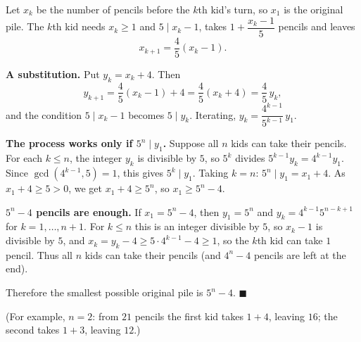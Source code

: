 Let $x_k$ be the number of pencils before the $k$th kid's turn, so $x_1$ is the original pile. The $k$th kid needs $x_k\ge1$ and $5\mid x_k-1$, takes $1+\dfrac{x_k-1}{5}$ pencils and leaves
\[x_{k+1}=\dfrac{4}{5}\left(x_k-1\right).\]

\textbf{A substitution.} Put $y_k=x_k+4$. Then
\[y_{k+1}=\dfrac{4}{5}\left(x_k-1\right)+4=\dfrac{4}{5}\left(x_k+4\right)=\dfrac{4}{5}\,y_k,\]
and the condition $5\mid x_k-1$ becomes $5\mid y_k$. Iterating, $y_k=\dfrac{4^{k-1}}{5^{k-1}}\,y_1$.

\textbf{The process works only if $5^n\mid y_1$.} Suppose all $n$ kids can take their pencils. For each $k\le n$, the integer $y_k$ is divisible by $5$, so $5^k$ divides $5^{k-1}y_k=4^{k-1}y_1$. Since $\gcd\left(4^{k-1},5\right)=1$, this gives $5^k\mid y_1$. Taking $k=n$: $5^n\mid y_1=x_1+4$. As $x_1+4\ge5>0$, we get $x_1+4\ge5^n$, so $x_1\ge5^n-4$.

\textbf{$5^n-4$ pencils are enough.} If $x_1=5^n-4$, then $y_1=5^n$ and $y_k=4^{k-1}5^{n-k+1}$ for $k=1,\dots,n+1$. For $k\le n$ this is an integer divisible by $5$, so $x_k-1$ is divisible by $5$, and $x_k=y_k-4\ge5\cdot4^{k-1}-4\ge1$, so the $k$th kid can take $1$ pencil. Thus all $n$ kids can take their pencils (and $4^n-4$ pencils are left at the end).

Therefore the smallest possible original pile is $\boxed{5^n-4}$. $\blacksquare$

(For example, $n=2$: from $21$ pencils the first kid takes $1+4$, leaving $16$; the second takes $1+3$, leaving $12$.)
